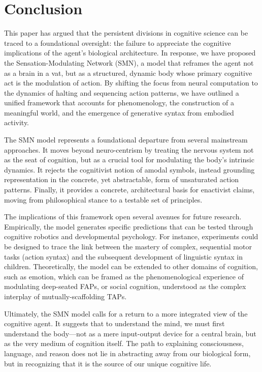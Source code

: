 \section{Conclusion}
This paper has argued that the persistent divisions in cognitive science can be traced to a foundational oversight: the failure to appreciate the cognitive implications of the agent's biological architecture. In response, we have proposed the Sensation-Modulating Network (SMN), a model that reframes the agent not as a brain in a vat, but as a structured, dynamic body whose primary cognitive act is the modulation of action. By shifting the focus from neural computation to the dynamics of halting and sequencing action patterns, we have outlined a unified framework that accounts for phenomenology, the construction of a meaningful world, and the emergence of generative syntax from embodied activity.

The SMN model represents a foundational departure from several mainstream approaches. It moves beyond neuro-centrism by treating the nervous system not as the seat of cognition, but as a crucial tool for modulating the body's intrinsic dynamics. It rejects the cognitivist notion of amodal symbols, instead grounding representation in the concrete, yet abstractable, form of unsaturated action patterns. Finally, it provides a concrete, architectural basis for enactivist claims, moving from philosophical stance to a testable set of principles.

The implications of this framework open several avenues for future research. Empirically, the model generates specific predictions that can be tested through cognitive robotics and developmental psychology. For instance, experiments could be designed to trace the link between the mastery of complex, sequential motor tasks (action syntax) and the subsequent development of linguistic syntax in children. Theoretically, the model can be extended to other domains of cognition, such as emotion, which can be framed as the phenomenological experience of modulating deep-seated FAPs, or social cognition, understood as the complex interplay of mutually-scaffolding TAPs.

Ultimately, the SMN model calls for a return to a more integrated view of the cognitive agent. It suggests that to understand the mind, we must first understand the body—not as a mere input-output device for a central brain, but as the very medium of cognition itself. The path to explaining consciousness, language, and reason does not lie in abstracting away from our biological form, but in recognizing that it is the source of our unique cognitive life.
